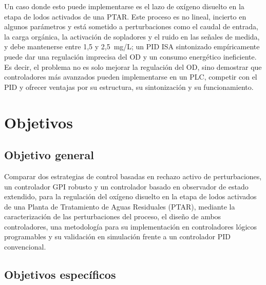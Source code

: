 Un caso donde esto puede implementarse es el lazo de oxígeno disuelto en la etapa de lodos
activados de una PTAR. Este proceso es no lineal, incierto en algunos parámetros y está sometido a
perturbaciones como el caudal de entrada, la carga orgánica, la activación de sopladores y el ruido
en las señales de medida, y debe mantenerse entre 1,5 y 2,5~mg/L; un PID ISA sintonizado
empíricamente puede dar una regulación imprecisa del OD y un consumo energético ineficiente. Es
decir, el problema no es solo mejorar la regulación del OD, sino demostrar que controladores más
avanzados pueden implementarse en un PLC, competir con el PID y ofrecer ventajas por su estructura,
su sintonización y su funcionamiento.


\section{Objetivos}
\label{sec:objetivos}

\subsection{Objetivo general}

Comparar dos estrategias de control basadas en rechazo activo de perturbaciones, un controlador GPI
robusto y un controlador basado en observador de estado extendido, para la regulación del oxígeno
disuelto en la etapa de lodos activados de una Planta de Tratamiento de Aguas Residuales (PTAR),
mediante la caracterización de las perturbaciones del proceso, el diseño de ambos controladores, una
metodología para su implementación en controladores lógicos programables y su validación en
simulación frente a un controlador PID convencional.

\subsection{Objetivos específicos}

